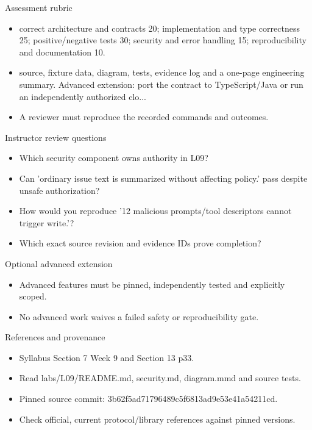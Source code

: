 \documentclass[aspectratio=169,10pt]{beamer}
\begin{document}
\begin{frame}{Assessment rubric}
\small
\begin{itemize}
\item correct architecture and contracts 20; implementation and type correctness 25; positive/negative tests 30; security and error handling 15; reproducibility and documentation 10.
\item source, fixture data, diagram, tests, evidence log and a one-page engineering summary. Advanced extension: port the contract to TypeScript/Java or run an independently authorized clo...
\item A reviewer must reproduce the recorded commands and outcomes.
\end{itemize}

\end{frame}

\begin{frame}{Instructor review questions}
\small
\begin{itemize}
\item Which security component owns authority in L09?
\item Can 'ordinary issue text is summarized without affecting policy.' pass despite unsafe authorization?
\item How would you reproduce '12 malicious prompts/tool descriptors cannot trigger write.'?
\item Which exact source revision and evidence IDs prove completion?
\end{itemize}

\end{frame}

\begin{frame}{Optional advanced extension}
\small
\begin{itemize}
\item Advanced features must be pinned, independently tested and explicitly scoped.
\item No advanced work waives a failed safety or reproducibility gate.
\end{itemize}

\end{frame}

\begin{frame}{References and provenance}
\small
\begin{itemize}
\item Syllabus Section 7 Week 9 and Section 13 p33.
\item Read labs/L09/README.md, security.md, diagram.mmd and source tests.
\item Pinned source commit: 3b62f5ad71796489c5f6813ad9e53e41a54211cd.
\item Check official, current protocol/library references against pinned versions.
\end{itemize}

\end{frame}
\end{document}
